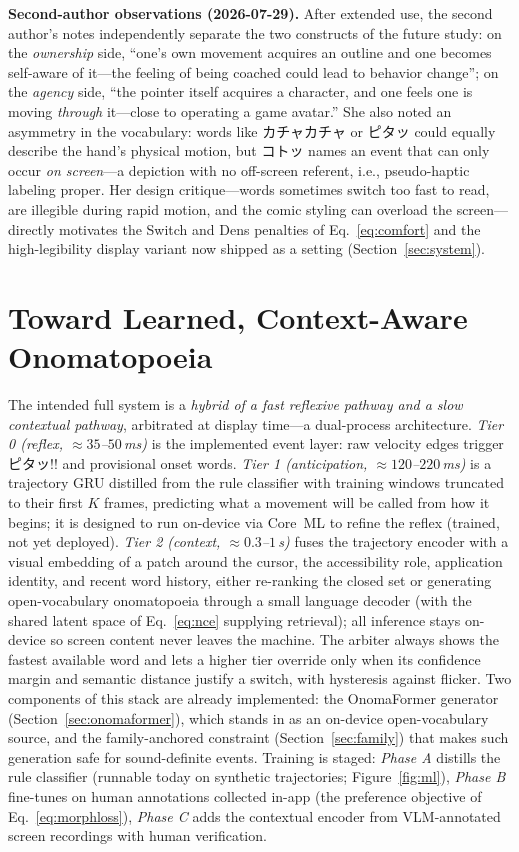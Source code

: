 \documentclass[sigconf,nonacm]{acmart}
\newcommand{\jp}[1]{#1}
\begin{document}
\textbf{Second-author observations (2026-07-29).} After extended use, the second author's notes independently separate the two constructs of the future study: on the \emph{ownership} side, ``one's own movement acquires an outline and one becomes self-aware of it---the feeling of being coached could lead to behavior change''; on the \emph{agency} side, ``the pointer itself acquires a character, and one feels one is moving \emph{through} it---close to operating a game avatar.'' She also noted an asymmetry in the vocabulary: words like \jp{カチャカチャ} or \jp{ピタッ} could equally describe the hand's physical motion, but \jp{コトッ} names an event that can only occur \emph{on screen}---a depiction with no off-screen referent, i.e., pseudo-haptic labeling proper. Her design critique---words sometimes switch too fast to read, are illegible during rapid motion, and the comic styling can overload the screen---directly motivates the Switch and Dens penalties of Eq.~\ref{eq:comfort} and the high-legibility display variant now shipped as a setting (Section~\ref{sec:system}).

\section{Toward Learned, Context-Aware Onomatopoeia}
\label{sec:ml}

The intended full system is a \emph{hybrid of a fast reflexive pathway and a slow contextual pathway}, arbitrated at display time---a dual-process architecture. \emph{Tier 0 (reflex, ${\approx}35$--$50$\,ms)} is the implemented event layer: raw velocity edges trigger \jp{ピタッ!!} and provisional onset words. \emph{Tier 1 (anticipation, ${\approx}120$--$220$\,ms)} is a trajectory GRU distilled from the rule classifier with training windows truncated to their first $K$ frames, predicting what a movement will be called from how it begins; it is designed to run on-device via Core~ML to refine the reflex (trained, not yet deployed). \emph{Tier 2 (context, ${\approx}0.3$--$1$\,s)} fuses the trajectory encoder with a visual embedding of a patch around the cursor, the accessibility role, application identity, and recent word history, either re-ranking the closed set or generating open-vocabulary onomatopoeia through a small language decoder (with the shared latent space of Eq.~\ref{eq:nce} supplying retrieval); all inference stays on-device so screen content never leaves the machine. The arbiter always shows the fastest available word and lets a higher tier override only when its confidence margin and semantic distance justify a switch, with hysteresis against flicker. Two components of this stack are already implemented: the OnomaFormer generator (Section~\ref{sec:onomaformer}), which stands in as an on-device open-vocabulary source, and the family-anchored constraint (Section~\ref{sec:family}) that makes such generation safe for sound-definite events. Training is staged: \emph{Phase A} distills the rule classifier (runnable today on synthetic trajectories; Figure~\ref{fig:ml}), \emph{Phase B} fine-tunes on human annotations collected in-app (the preference objective of Eq.~\ref{eq:morphloss}), \emph{Phase C} adds the contextual encoder from VLM-annotated screen recordings with human verification.
\end{document}
